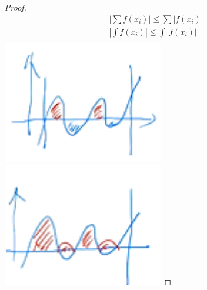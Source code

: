 \documentclass[dvipdfmx,10pt, a4j]{jarticle}
\theoremstyle{definition}
\begin{document}
\begin{proof}
    \begin{align*}
         & |\sum f(x_i)| \leq \sum|f(x_i)| \\
         & |\int f(x_i)| \leq \int|f(x_i)| \\
    \end{align*}
    \includegraphics[width=7.0cm]{D_8/img_1.png}
    \includegraphics[width=7.0cm]{D_8/img_2.png}
\end{proof}
\end{document}
